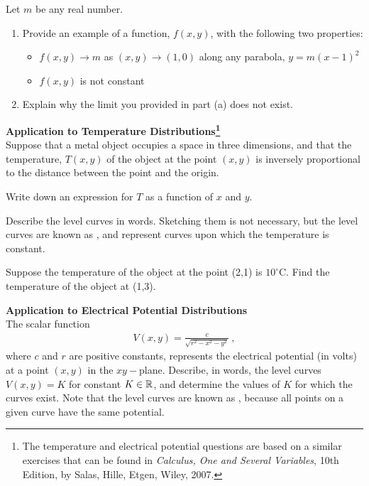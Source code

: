 \item Let $m$ be any real number. 
\begin{enumerate}
\item Provide an example of a function, $f(x,y)$, with the following two properties:
\begin{itemize}
\item $f(x,y) \rightarrow m$ as $(x,y) \rightarrow (1,0)$ along any parabola, $y=m(x-1)^2$
\item $f(x,y)$ is not constant
\end{itemize}
\item Explain why the limit you provided in part (a) does not exist. 
\end{enumerate}
\item \textbf{Application to Temperature Distributions\footnote{The temperature and electrical potential questions are based on a similar exercises that can be found in \textit{Calculus, One and Several Variables}, 10th Edition, by Salas, Hille, Etgen, Wiley, 2007.}}\\
Suppose that a metal object occupies a space in three dimensions, and that the temperature, $T(x,y)$ of the object at the point $(x,y)$ is inversely proportional to the distance between the point and the origin. 
\BEN
\item Write down an expression for $T$ as a function of $x$ and $y$.
\item Describe the level curves in words. Sketching them is not necessary, but the level curves are known as , and represent curves upon which the temperature is constant. 
\item Suppose the temperature of the object at the point (2,1) is $10^{\circ}$C. Find the temperature of the object at (1,3).
\EEN
\item \textbf{Application to Electrical Potential Distributions}\\
The scalar function
\begin{align*}
V(x,y) = \frac{c}{\sqrt{r^2 - x^2 -y^2}}\ ,
\end{align*}
where $c$ and $r$ are positive constants, represents the electrical potential (in volts) at a point $(x,y)$ in the $xy-$plane. Describe, in words, the level curves $V(x,y)=K$ for constant $K\in\mathbb{R}$, and determine the values of $K$ for which the curves exist. Note that the level curves are known as , because all points on a given curve have the same potential. 

